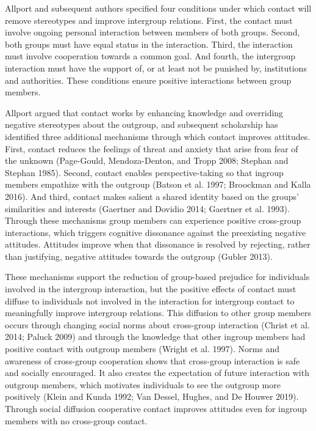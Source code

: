 \documentclass[11pt]{article}
\begin{document}
Allport and subsequent authors specified four conditions under which
contact will remove stereotypes and improve intergroup relations. First,
the contact must involve ongoing personal interaction between members of
both groups. Second, both groups must have equal status in the
interaction. Third, the interaction must involve cooperation towards a
common goal. And fourth, the intergroup interaction must have the
support of, or at least not be punished by, institutions and
authorities. These conditions ensure positive interactions between group
members.

Allport argued that contact works by enhancing knowledge and overriding
negative stereotypes about the outgroup, and subsequent scholarship has
identified three additional mechanisms through which contact improves
attitudes. First, contact reduces the feelings of threat and anxiety
that arise from fear of the unknown (Page-Gould, Mendoza-Denton, and
Tropp 2008; Stephan and Stephan 1985). Second, contact enables
perspective-taking so that ingroup members empathize with the outgroup
(Batson et al. 1997; Broockman and Kalla 2016). And third, contact makes
salient a shared identity based on the groups' similarities and
interests (Gaertner and Dovidio 2014; Gaertner et al. 1993). Through
these mechanisms group members can experience positive cross-group
interactions, which triggers cognitive dissonance against the
preexisting negative attitudes. Attitudes improve when that dissonance
is resolved by rejecting, rather than justifying, negative attitudes
towards the outgroup (Gubler 2013).

These mechanisms support the reduction of group-based prejudice for
individuals involved in the intergroup interaction, but the positive
effects of contact must diffuse to individuals not involved in the
interaction for intergroup contact to meaningfully improve intergroup
relations. This diffusion to other group members occurs through changing
social norms about cross-group interaction (Christ et al. 2014; Paluck
2009) and through the knowledge that other ingroup members had positive
contact with outgroup members (Wright et al. 1997). Norms and awareness
of cross-group cooperation shows that cross-group interaction is safe
and socially encouraged. It also creates the expectation of future
interaction with outgroup members, which motivates individuals to see
the outgroup more positively (Klein and Kunda 1992; Van Dessel, Hughes,
and De Houwer 2019). Through social diffusion cooperative contact
improves attitudes even for ingroup members with no cross-group contact.
\end{document}
